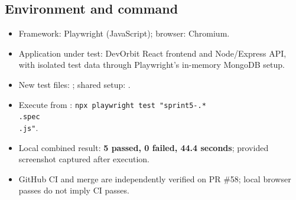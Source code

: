 \documentclass[11pt,a4paper]{article}
\begin{document}
\subsection{Environment and command}
\begin{itemize}
\item Framework: Playwright (JavaScript); browser: Chromium.
\item Application under test: DevOrbit React frontend and Node/Express API, with isolated test data through Playwright's in-memory MongoDB setup.
\item New test files: ; shared setup: .
\item Execute from : \texttt{npx playwright test "sprint5-.*\\.spec\\.js"}.
\item Local combined result: \textbf{5 passed, 0 failed, 44.4 seconds}; provided screenshot captured after execution.
\item GitHub CI and merge are independently verified on PR \#58; local browser passes do not imply CI passes.
\end{itemize}
\end{document}
